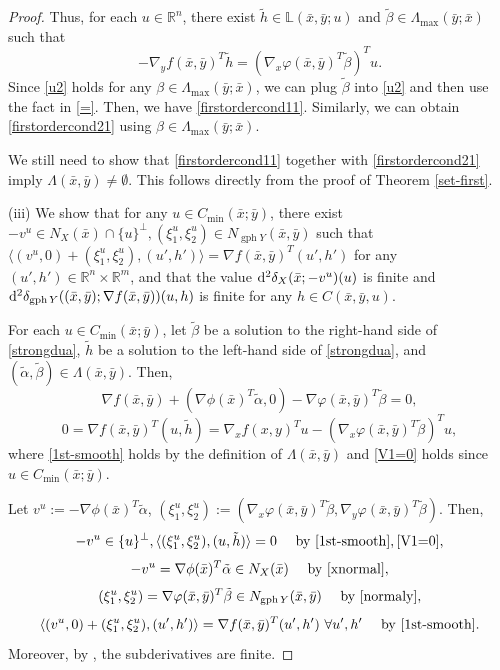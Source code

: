 \documentclass[11pt]{article}
\numberwithin{equation}{section}
\begin{document}
{\begin{proof}
Thus, for each $u \in \mathbb{R}^n$, there exist $\tilde h \in \mathbb{L}(\bar x,\bar y;u)$ and $\tilde \beta \in \Lambda_{\max}(\bar y; \bar x)$ such that 
\begin{equation}\label{=}
-\nabla_y f(\bar x,\bar y)^T\tilde h =  (\nabla_x \varphi(\bar x,\bar y)^T\tilde \beta)^Tu.
\end{equation}
Since \eqref{u2} holds for any $\beta \in \Lambda_{\max}(\bar y; \bar x)$, we can plug $\tilde \beta$ into \eqref{u2} and then use the fact in \eqref{=}. Then, we have \eqref{firstordercond11}. Similarly, we can obtain \eqref{firstordercond21} using $\beta \in \Lambda_{\max}(\bar y; \bar x)$.

We still need to show that \eqref{firstordercond11} together with \eqref{firstordercond21} imply $\Lambda(\bar x,\bar y) \neq \emptyset$. This follows directly from the proof of Theorem \ref{set-first}.

(iii) We show that for any $u\in C_{\min}(\bar x; \bar y)$,  there exist $-v^u\in N_X(\bar x)\cap \{u\}^\perp, (\xi_1^u,\xi_2^u) \in N_{\operatorname{gph}Y}(\bar x,\bar y)$ such that $\langle (v^u,0)+(\xi_1^u,\xi_2^u), (u',h') \rangle =\nabla  f(\bar x,\bar y)^T(u',h')$ for any $(u',h') \in \mathbb{R}^n \times \mathbb{R}^m$,  and that the value ${\rm d}^2 \delta_X(\bar x;-v^u)(u)$ is finite and ${\rm d}^2 \delta_{\operatorname{gph}Y}((\bar x,\bar y);\nabla  f(\bar x,\bar y))(u,h)$ is finite for any $h \in C(\bar x,\bar y,u)$.

For each $u\in C_{\min}(\bar x; \bar y)$, let $\tilde{\beta}$ be a solution to the right-hand side of \eqref{strongdua}, $\tilde h$  be a solution to the left-hand side of \eqref{strongdua}, and $(\tilde \alpha, \tilde \beta )\in \Lambda(\bar x,\bar y)$. Then, 
\begin{equation}\label{1st-smooth}
	\nabla f(\bar x,\bar y) + (\nabla \phi (\bar x)^T \tilde \alpha,0) -\nabla \varphi(\bar x,\bar y)^T \tilde \beta =0,
\end{equation}
\begin{equation}\label{V1=0}
0=\nabla f(\bar x,\bar y)^T(u,\tilde h) =  \nabla_x f(x,y)^Tu -  (\nabla_x \varphi(\bar x,\bar y)^T\tilde \beta)^Tu,
\end{equation}
where \eqref{1st-smooth} holds by the definition of $\Lambda(\bar x,\bar y)$ and \eqref{V1=0} holds since $u\in C_{\min}(\bar x; \bar y)$.

Let $v^u:=-\nabla \phi(\bar{x})^T\tilde \alpha$, $(\xi_1^u,\xi_2^u):=(\nabla_x \varphi(\bar x,\bar y)^T\tilde \beta ,\nabla_y \varphi(\bar x,\bar y)^T\tilde \beta)$. Then,
$$-v^u \in \{u\}^{\perp}, \langle (\xi_1^u,\xi_2^u),(u,\tilde h) \rangle =0 \quad \mbox{ by } \eqref{1st-smooth},\eqref{V1=0},$$
$$-v^u=\nabla \phi(\bar{x})^T\tilde \alpha   \in N_{X}(\bar x)  \quad \mbox{ by } \eqref{xnormal},$$
$$(\xi_1^u,\xi_2^u) = \nabla \varphi(\bar x,\bar y)^T\tilde \beta \in N_{\operatorname{gph} Y}(\bar x,\bar y) \quad \mbox{ by } \eqref{normaly},$$
$$ \langle (v^u,0) +(\xi_1^u,\xi_2^u), (u',h') \rangle=\nabla f(\bar x,\bar y)^T(u',h') \ \forall u',h'    \quad \mbox{ by } \eqref{1st-smooth}.$$
Moreover, by \cite[Theorem 3.3]{ABM21}, the subderivatives are finite. 


\end{proof}}
\end{document}
